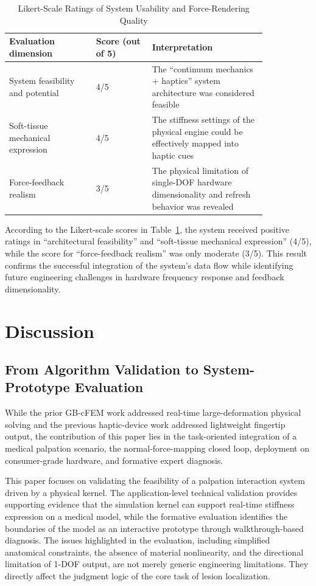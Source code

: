 \documentclass{ieeeaccess}
\begin{document}
\begin{table}[htbp]
\caption{Likert-Scale Ratings of System Usability and Force-Rendering Quality}
\label{tab:likert}
\centering
\footnotesize
\renewcommand{\arraystretch}{1.15}
\begin{tabular}{|p{0.29\linewidth}|p{0.18\linewidth}|p{0.37\linewidth}|}
\hline
Evaluation dimension & Score (out of 5) & Interpretation \\
\hline
System feasibility and potential & 4/5 & The ``continuum mechanics + haptics'' system architecture was considered feasible \\
\hline
Soft-tissue mechanical expression & 4/5 & The stiffness settings of the physical engine could be effectively mapped into haptic cues \\
\hline
Force-feedback realism & 3/5 & The physical limitation of single-DOF hardware dimensionality and refresh behavior was revealed \\
\hline
\end{tabular}
\end{table}

According to the Likert-scale scores in Table~\ref{tab:likert}, the system received positive ratings in ``architectural feasibility'' and ``soft-tissue mechanical expression'' (4/5), while the score for ``force-feedback realism'' was only moderate (3/5). This result confirms the successful integration of the system's data flow while identifying future engineering challenges in hardware frequency response and feedback dimensionality.

\section{Discussion}
\subsection{From Algorithm Validation to System-Prototype Evaluation}
While the prior GB-cFEM work addressed real-time large-deformation physical solving and the previous haptic-device work addressed lightweight fingertip output, the contribution of this paper lies in the task-oriented integration of a medical palpation scenario, the normal-force-mapping closed loop, deployment on consumer-grade hardware, and formative expert diagnosis.

This paper focuses on validating the feasibility of a palpation interaction system driven by a physical kernel. The application-level technical validation provides supporting evidence that the simulation kernel can support real-time stiffness expression on a medical model, while the formative evaluation identifies the boundaries of the model as an interactive prototype through walkthrough-based diagnosis. The issues highlighted in the evaluation, including simplified anatomical constraints, the absence of material nonlinearity, and the directional limitation of 1-DOF output, are not merely generic engineering limitations. They directly affect the judgment logic of the core task of lesion localization.
\end{document}

